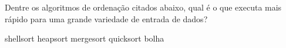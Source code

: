 \documentclass[12pt, addpoints]{exam}
\begin{document}
\begin{questions}
\question

Dentre os algoritmos de ordenação citados abaixo, qual é o que executa mais rápido para uma grande variedade de entrada de dados? 
\begin{choices}
\choice shellsort
\choice heapsort
\choice mergesort
\choice quicksort
\choice bolha
\end{choices}



    \end{questions}
    
\end{document}
